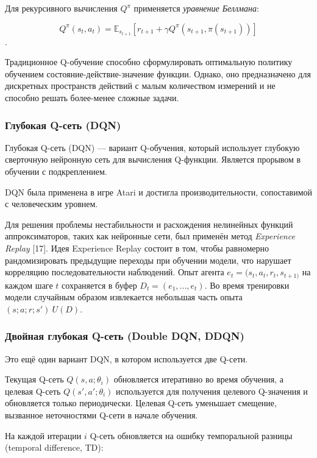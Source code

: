 Для рекурсивного вычисления $Q^\pi$ применяется {\itshape уравнение Беллмана}:

\begin{equation} \label{eq:q-learning-bellmanEq}
Q^\pi(s_t, a_t) = \mathbb{E}_{s_{t+1}}[r_{t+1} + \gamma Q^\pi (s_{t+1}, \pi(s_{t+1}))]
\end{equation}.

Традиционное Q-обучение способно сформулировать оптимальную политику обучением состояние-действие-значение функции. Однако, оно предназначено для дискретных пространств действий с малым количеством измерений и не способно решать более-менее сложные задачи.

\subsubsection{Глубокая Q-сеть (DQN)}

Глубокая Q-сеть (DQN) --- вариант Q-обучения, который использует глубокую сверточную нейронную сеть для вычисления Q-функции. Является прорывом в обучении с подкреплением. \cite{bertsekas1996neuro}

DQN была применена в игре Atari и достигла производительности, сопоставимой с человеческим уровнем. \cite{Mnih2015}

Для решения проблемы нестабильности и расхождения нелинейных функций аппроксиматоров, таких как нейронные сети, был применён метод {\itshape Experience Replay} [17]. Идея Experience Replay состоит в том, чтобы равномерно рандомизировать предыдущие переходы при обучении модели, что нарушает корреляцию последовательности наблюдений. Опыт агента $e_t = (s_t, a_t, r_t, s_{t+1)}$ на каждом шаге $t$ сохраняется в буфер $D_t = ({e_1, ..., e_t})$. Во время тренировки модели случайным образом извлекается небольшая часть опыта $(s; a; r; s') ~ U(D)$.

\subsubsection{Двойная глубокая Q-сеть (Double DQN, DDQN)}

Это ещё один вариант DQN, в котором используется две Q-сети.

Текущая Q-сеть $Q(s, a; \theta_i)$ обновляется итеративно во время обучения, а целевая Q-сеть $Q(s', a'; \theta_i)$ используется для получения целевого Q-значения и обновляется только периодически. Целевая Q-сеть уменьшает смещение, вызванное неточностями Q-сети в начале обучения.

На каждой итерации $i$ Q-сеть обновляется на ошибку темпоральной разницы (temporal difference, TD):

